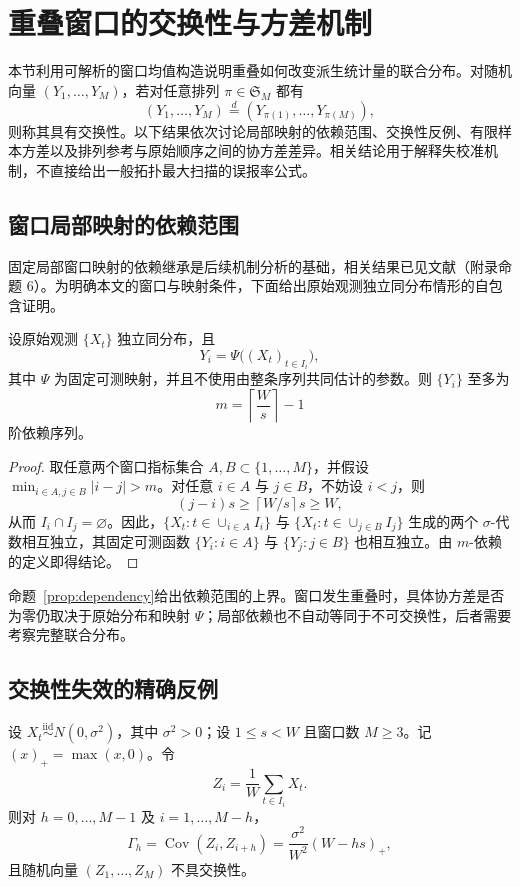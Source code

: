 \section{重叠窗口的交换性与方差机制}\label{sec:theory}

本节利用可解析的窗口均值构造说明重叠如何改变派生统计量的联合分布。对随机向量 $(Y_1,\ldots,Y_M)$，若对任意排列 $\pi\in\mathfrak S_M$ 都有
\[
 (Y_1,\ldots,Y_M)\overset d=(Y_{\pi(1)},\ldots,Y_{\pi(M)}),
\]
则称其具有交换性。以下结果依次讨论局部映射的依赖范围、交换性反例、有限样本方差以及排列参考与原始顺序之间的协方差差异。相关结论用于解释失校准机制，不直接给出一般拓扑最大扫描的误报率公式。

\subsection{窗口局部映射的依赖范围}\label{sec:t1}

固定局部窗口映射的依赖继承是后续机制分析的基础，相关结果已见文献\cite{NieYue2026}（附录命题 6）。为明确本文的窗口与映射条件，下面给出原始观测独立同分布情形的自包含证明。

\begin{proposition}[局部映射的有限依赖范围]\label{prop:dependency}
设原始观测 $\{X_t\}$ 独立同分布，且
\[
 Y_i=\Psi\bigl((X_t)_{t\in I_i}\bigr),
\]
其中 $\Psi$ 为固定可测映射，并且不使用由整条序列共同估计的参数。则 $\{Y_i\}$ 至多为
\[
 m=\left\lceil\frac Ws\right\rceil-1
\]
阶依赖序列。
\end{proposition}

\begin{proof}
取任意两个窗口指标集合 $A,B\subset\{1,\ldots,M\}$，并假设 $\min_{i\in A,j\in B}|i-j|>m$。对任意 $i\in A$ 与 $j\in B$，不妨设 $i<j$，则
$$(j-i)s\ge\left\lceil W/s\right\rceil s\ge W,$$
从而 $I_i\cap I_j=\varnothing$。因此，$\{X_t:t\in\cup_{i\in A}I_i\}$ 与 $\{X_t:t\in\cup_{j\in B}I_j\}$ 生成的两个 $\sigma$-代数相互独立，其固定可测函数 $\{Y_i:i\in A\}$ 与 $\{Y_j:j\in B\}$ 也相互独立。由 $m$-依赖的定义即得结论。
\end{proof}

命题~\ref{prop:dependency}给出依赖范围的上界。窗口发生重叠时，具体协方差是否为零仍取决于原始分布和映射 $\Psi$；局部依赖也不自动等同于不可交换性，后者需要考察完整联合分布。

\subsection{交换性失效的精确反例}\label{sec:t2}

\begin{proposition}[高斯窗口均值的非交换性]\label{prop:counterexample}
设 $X_t\overset{\mathrm{iid}}{\sim}N(0,\sigma^2)$，其中 $\sigma^2>0$；设 $1\le s<W$ 且窗口数 $M\ge3$。记 $(x)_+=\max(x,0)$。令
\[
 Z_i=\frac1W\sum_{t\in I_i}X_t.
\]
则对 $h=0,\ldots,M-1$ 及 $i=1,\ldots,M-h$，
\begin{equation}\label{eq:window-cov}
 \Gamma_h=\operatorname{Cov}(Z_i,Z_{i+h})
 =\frac{\sigma^2}{W^2}(W-hs)_+,
\end{equation}
且随机向量 $(Z_1,\ldots,Z_M)$ 不具交换性。
\end{proposition}

